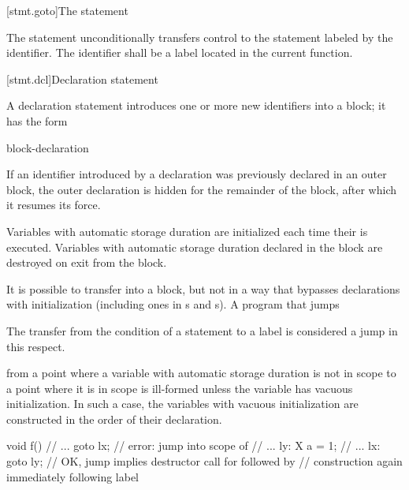[stmt.goto]{The  statement}%

\pnum
The  statement unconditionally transfers control to the
statement labeled by the identifier. The identifier shall be a
%
label located in the current function.

[stmt.dcl]{Declaration statement}%

\pnum
A declaration statement introduces one or more new identifiers into a
block; it has the form
\begin{bnf}
\br
    block-declaration
\end{bnf}

If an identifier introduced by a declaration was previously declared in
an outer block,
%
%
%
the outer declaration is hidden for the remainder of the block, after
which it resumes its force.

\pnum
{}%
%
Variables with automatic storage duration are
initialized each time their  is executed.
%
Variables with automatic storage duration declared in the block are
destroyed on exit from the block.

\pnum
{}%
%
It is possible to transfer into a block, but not in a way that bypasses
declarations with initialization (including ones in s
and s).
A program that jumps
\begin{footnote}
The transfer from the condition of a  statement to a
 label is considered a jump in this respect.
\end{footnote}
from a point where a variable with automatic storage duration is
not in scope to a point where it is in scope is ill-formed unless
the variable has vacuous initialization.
In such a case, the variables with vacuous initialization
are constructed in the order of their declaration.
\begin{example}
\begin{codeblock}
void f() {
  // ...
  goto lx;          // error: jump into scope of 
  // ...
ly:
  X a = 1;
  // ...
lx:
  goto ly;          // OK, jump implies destructor call for  followed by
                    // construction again immediately following label 
}
\end{codeblock}
\end{example}

